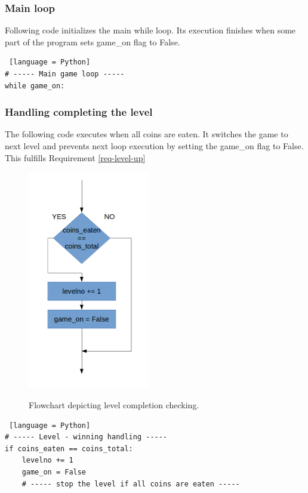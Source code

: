 \documentclass[11pt,a4paper,notitlepage]{report}
\newenvironment{img}{
	\begin{center}
		\begin{figure}[H]
			\begin{center}
			
}{
	\end{center}
		\end{figure}
			\end{center}
}
\begin{document}
				\subsubsection{Main loop}
					Following code initializes the main while loop. Its execution finishes when some part of the program sets game\_on flag to False.
					\begin{lstlisting} [language = Python]
# ----- Main game loop -----
while game_on:
					\end{lstlisting}
				\subsubsection{Handling completing the level}
					The following code executes when all coins are eaten. It switches the game to next level and prevents next loop execution by setting the game\_on flag to False. This fulfills Requirement \ref{req-level-up}\\
					\begin{img}
						\includegraphics[width=150pt]{images/level_progress_flowchart.png}\\
						\caption{Flowchart depicting level completion checking.}
					\end{img}
					\begin{lstlisting} [language = Python]
# ----- Level - winning handling -----
if coins_eaten == coins_total:
	levelno += 1
	game_on = False
	# ----- stop the level if all coins are eaten -----
					\end{lstlisting}
\end{document}
